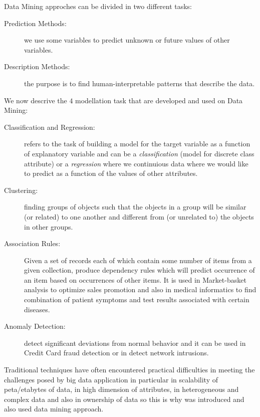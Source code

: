 Data Mining approches can be divided in two different tasks:
\begin{description}
    \item [Prediction Methods: ] we use some variables to predict unknown or future values of other variables.
    \item [Description Methods: ] the purpose is to find human-interpretable patterns that describe the data.
\end{description}
We now descrive the $4$ modellation task that are developed and used on Data Mining:
\begin{description}
    \item [Classification and Regression: ] refers to the task of building a model for the target variable
           as a function of explanatory variable and can be a \emph{classification} 
           (model for discrete class attribute) or a \emph{regression} where  we continuious data 
           where we would like to predict as a function of the values of other attributes.
    \item [Clustering: ] finding groups of objects such that the objects in a group will be similar (or related)
                         to one another and different from (or unrelated to) the objects in other groups.
    \item [Association Rules: ] Given a set of records each of which contain some number of items 
           from a given collection, produce dependency rules which will predict occurrence of an item based
           on occurrences of other items.\newline
           It is used in Market-basket analysis to optimize sales promotion and also in medical informatics to 
           find combination of patient symptoms and test results associated with certain diseases.
    \item [Anomaly Detection: ] detect significant deviations from normal behavior and it can be used 
                                in Credit Card fraud detection or in detect network intrusions.
\end{description}
Traditional techniques have often encountered practical difficulties in meeting the challenges posed by
big data application in particular in scalability of peta/etabytes of data, in high dimension of attributes, 
in heterogeneous and complex data and also in ownership of data so this is why was introduced and also used
data mining approach.

